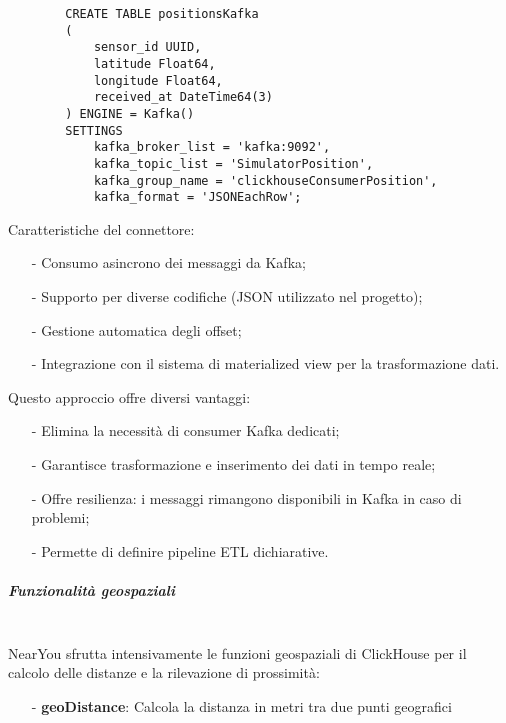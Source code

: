 \documentclass[10pt]{article}
\newcommand{\mysubparagraph}[1]{\subparagraph{#1}\mbox{}\\}
\begin{document}
        \begin{lstlisting}
        CREATE TABLE positionsKafka
        (
            sensor_id UUID,
            latitude Float64,
            longitude Float64,
            received_at DateTime64(3)
        ) ENGINE = Kafka()
        SETTINGS 
            kafka_broker_list = 'kafka:9092',
            kafka_topic_list = 'SimulatorPosition',
            kafka_group_name = 'clickhouseConsumerPosition',
            kafka_format = 'JSONEachRow';
        \end{lstlisting}
        
        Caratteristiche del connettore:
        \begin{itemize}
            \item[-] Consumo asincrono dei messaggi da Kafka;
            \item[-] Supporto per diverse codifiche (JSON utilizzato nel progetto);
            \item[-] Gestione automatica degli offset;
            \item[-] Integrazione con il sistema di materialized view per la trasformazione dati.
        \end{itemize}
        
        Questo approccio offre diversi vantaggi:
        \begin{itemize}
            \item[-] Elimina la necessità di consumer Kafka dedicati;
            \item[-] Garantisce trasformazione e inserimento dei dati in tempo reale;
            \item[-] Offre resilienza: i messaggi rimangono disponibili in Kafka in caso di problemi;
            \item[-] Permette di definire pipeline ETL dichiarative.
        \end{itemize}
        
        \mysubparagraph{Funzionalità geospaziali}
        NearYou sfrutta intensivamente le funzioni geospaziali di ClickHouse per il calcolo delle distanze e la rilevazione di prossimità:
        
        \begin{itemize}
            \item[-] \textbf{geoDistance}: Calcola la distanza in metri tra due punti geografici
        \end{itemize}
        
\end{document}
